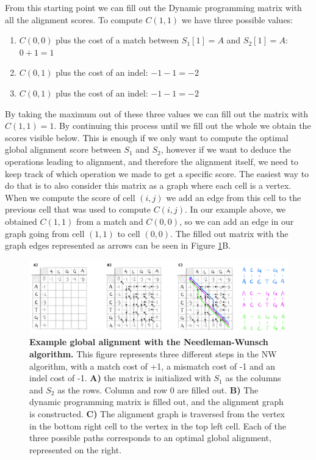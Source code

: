 \documentclass[
  11pt,
  twoside,
  BCOR=10mm,
  listof=totoc]{scrbook}
\providecommand{\tightlist}{%
  \setlength{\itemsep}{0pt}\setlength{\parskip}{0pt}}
\newcommand{\extcaption}[2]{
    \caption[#1]{
        \textbf{#1}\newline
        #2
    }
}
\begin{document}
From this starting point we can fill out the Dynamic programming matrix with all the alignment scores. To compute \(C(1,1)\) we have three possible values:

\begin{enumerate}
\def\labelenumi{\arabic{enumi}.}
\tightlist
\item
  \(C(0,0)\) plus the cost of a match between \(S_1[1]=A\) and \(S_2[1]=A\): \(0+1=1\)
\item
  \(C(0,1)\) plus the cost of an indel: \(-1 -1 = -2\)
\item
  \(C(0,1)\) plus the cost of an indel: \(-1-1=-2\)
\end{enumerate}

By taking the maximum out of these three values we can fill out the matrix with \(C(1,1)=1\). By continuing this process until we fill out the whole we obtain the scores visible below. This is enough if we only want to compute the optimal global alignment score between \(S_1\) and \(S_2\), however if we want to deduce the operations leading to alignment, and therefore the alignment itself, we need to keep track of which operation we made to get a specific score. The easiest way to do that is to also consider this matrix as a graph where each cell is a vertex. When we compute the score of cell \((i,j)\) we add an edge from this cell to the previous cell that was used to compute \(C(i,j)\). In our example above, we obtained \(C(1,1)\) from a match and \(C(0,0)\), so we can add an edge in our graph going from cell \((1,1)\) to cell \((0,0)\). The filled out matrix with the graph edges represented as arrows can be seen in Figure \ref{fig:nwAlign}B.

\begin{figure}[h]
\centering
\includegraphics[width=\linewidth]{./figures/Align-Intro/NW-total.png}
\extcaption{Example global alignment with the Needleman-Wunsch algorithm.}{This figure represents three different steps in the NW algorithm, with a match cost of +1, a mismatch cost of -1 and an indel cost of -1. \textbf{A)} the matrix is initialized with $S_1$ as the columns and $S_2$ as the rows. Column and row 0 are filled out. \textbf{B)} The dynamic programming matrix is filled out, and the alignment graph is constructed. \textbf{C)} The alignment graph is traversed from the vertex in the bottom right cell to the vertex in the top left cell. Each of the three possible paths corresponds to an optimal global alignment, represented on the right.}
\label{fig:nwAlign}
\end{figure}
\end{document}
